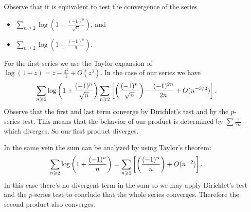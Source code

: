 \documentclass[12pt]{memoir}
\begin{document}
\begin{ptcbr}
    Observe that it is equivalent to test the convergence of the series 
    \begin{itemize}
        \itemsep=-0.4em
        \item $\sum_{n\geq 2}\log\left(1+\frac{(-1)^n}{\sqrt{n}}\right)$, and
        \item $\sum_{n\geq 2}\log\left(1+\frac{(-1)^n}{n}\right)$.
    \end{itemize}
    For the first series we use the Taylor expansion of $\log(1+z)=z-\frac{z^2}{2}+O(z^3)$. In the case of our series we have 
    $$\sum_{n\geqslant 2}\log\left(1+\frac{(-1)^n}{\sqrt{n}}\right)\sum_{n\geqslant 2}\left\lbrack\left(\frac{(-1)^n}{\sqrt{n}}\right)-\frac{(-1)^{2n}}{2n}+O(n^{-3/2})\right\rbrack.$$
    Observe that the first and last term converge by Dirichlet's test and by the $p$-series test. This means that the behavior of our product is determined by $\sum\frac{1}{2n}$ which diverges. So our first product diverges.\par 
    In the same vein the sum can be analyzed by using Taylor's theorem:
    $$\sum_{n\geqslant 2}\log\left(1+\frac{(-1)^n}{n}\right)=\sum_{n\geqslant 2}\left\lbrack\left(\frac{(-1)^n}{n}\right)+O(n^{-2})\right\rbrack.$$
    In this case there's no divergent term in the sum so we may apply Dirichlet's test and the $p$-series test to conclude that the whole series converges. Therefore the second product also converges.
\end{ptcbr}
\end{document}

